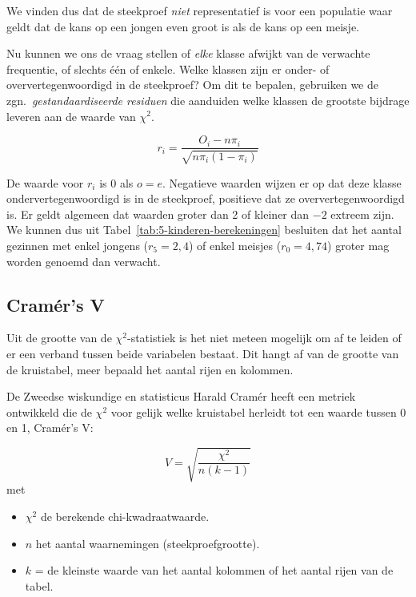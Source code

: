 We vinden dus dat de steekproef \emph{niet} representatief is voor een populatie waar geldt dat de kans op een jongen even groot is als de kans op een meisje.

Nu kunnen we ons de vraag stellen of \emph{elke} klasse afwijkt van de verwachte frequentie, of slechts één of enkele. Welke klassen zijn er onder- of oververtegenwoordigd in de steekproef? Om dit te bepalen, gebruiken we de zgn.~\emph{gestandaardiseerde residuen} die aanduiden welke klassen de grootste bijdrage leveren aan de waarde van $\chi^2$. 

\[ r_{i} = \frac{O_{i} - n \pi_{i}}{\sqrt{n \pi_{i}(1-\pi_{i})}} \]

%  

De waarde voor $r_i$ is 0 als $o = e$. Negatieve waarden wijzen er op dat deze klasse ondervertegenwoordigd is in de steekproef, positieve dat ze oververtegenwoordigd is. Er geldt algemeen dat waarden groter dan 2 of kleiner dan $-2$ extreem zijn. We kunnen dus uit Tabel~\ref{tab:5-kinderen-berekeningen} besluiten dat het aantal gezinnen met enkel jongens ($r_5 = 2,4$) of enkel meisjes ($r_0 = 4,74$) groter mag worden genoemd dan verwacht.

\subsection{Cramér's V}
\label{ssec:cramers-v}

Uit de grootte van de $\chi^2$-statistiek is het niet meteen mogelijk om af te leiden of er een verband tussen beide variabelen bestaat. Dit hangt af van de grootte van de kruistabel, meer bepaald het aantal rijen en kolommen.

De Zweedse wiskundige en statisticus Harald Cramér heeft een metriek ontwikkeld die de $\chi^2$ voor gelijk welke kruistabel herleidt tot een waarde tussen 0 en 1, Cramér's V:

\begin{definition}[Cramér's V]
  \begin{equation}
  V = \sqrt{\frac{\chi^{2}}{n (k-1)}}
  \label{eq:Cramer}
  \end{equation}
  met
  \begin{itemize}
    \item $\chi^{2}$ de berekende chi-kwadraatwaarde.
    \item $n$ het aantal waarnemingen (steekproefgrootte).
    \item $k$ = de kleinste waarde van het aantal kolommen of het aantal rijen van de tabel.
  \end{itemize}
  
\end{definition}

